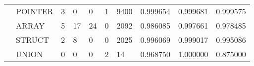 \begin{table}[t]
\begin{tabular}{lp{2.0cm}p{2.0cm}p{2.0cm}p{2.0cm}p{2.0cm}p{2.0cm}p{2.0cm}p{2.0cm}p{2.0cm}}
      & POINTER &                                  3 &                                 0 &                                0 &                                 1 &                            9400 &                        0.999654 &                               0.999681 &                             0.999575 \\
      & ARRAY &                                  5 &                                17 &                               24 &                                 0 &                            2092 &                        0.986085 &                               0.997661 &                             0.978485 \\
      & STRUCT &                                  2 &                                 8 &                                0 &                                 0 &                            2025 &                        0.996069 &                               0.999017 &                             0.995086 \\
      & UNION &                                  0 &                                 0 &                                0 &                                 2 &                              14 &                        0.968750 &                               1.000000 &                             0.875000 \\
\bottomrule
\end{tabular}
\end{table}
